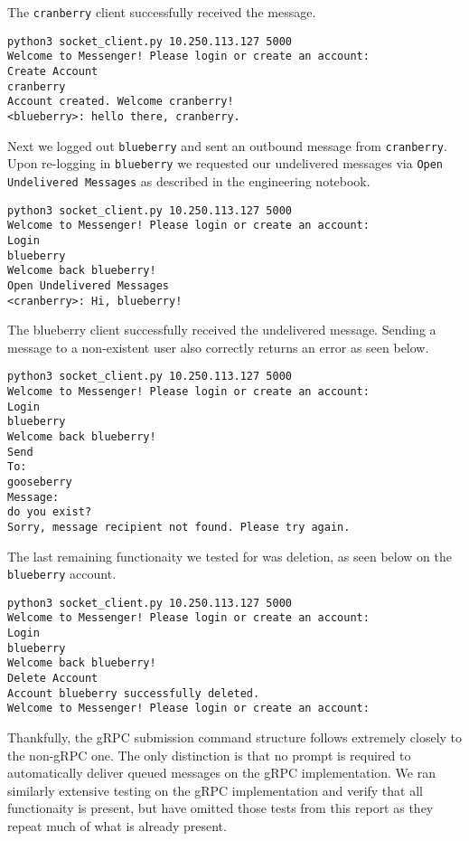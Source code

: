 \documentclass[9pt,twocolumn,twoside]{osajnl}
\begin{document}
\noindent The \texttt{cranberry} client successfully received the message.

\begin{lstlisting}[caption={Receive Live Message Test}]
python3 socket_client.py 10.250.113.127 5000
Welcome to Messenger! Please login or create an account:
Create Account
cranberry
Account created. Welcome cranberry!
<blueberry>: hello there, cranberry.
\end{lstlisting}

\noindent Next we logged out \texttt{blueberry} and sent an outbound message from \texttt{cranberry}. Upon re-logging in \texttt{blueberry} we requested our undelivered messages via \texttt{Open Undelivered Messages} as described in the engineering notebook.

\begin{lstlisting}[caption={Receive Undelivered Message Test}]
python3 socket_client.py 10.250.113.127 5000
Welcome to Messenger! Please login or create an account:
Login 
blueberry
Welcome back blueberry!
Open Undelivered Messages
<cranberry>: Hi, blueberry!
\end{lstlisting}

\noindent The blueberry client successfully received the undelivered message. Sending a message to a non-existent user also correctly returns an error as seen below.

\begin{lstlisting}[caption={Send Message to Nonexistent User Test}]
python3 socket_client.py 10.250.113.127 5000
Welcome to Messenger! Please login or create an account:
Login
blueberry
Welcome back blueberry!
Send
To: 
gooseberry
Message: 
do you exist?
Sorry, message recipient not found. Please try again. 
\end{lstlisting}

\noindent The last remaining functionaity we tested for was deletion, as seen below on the \texttt{blueberry} account.

\begin{lstlisting}[caption={Account Deletion Test}]
python3 socket_client.py 10.250.113.127 5000
Welcome to Messenger! Please login or create an account:
Login
blueberry
Welcome back blueberry!
Delete Account
Account blueberry successfully deleted. 
Welcome to Messenger! Please login or create an account:
\end{lstlisting}

\noindent Thankfully, the gRPC submission command structure follows extremely closely to the non-gRPC one. The only distinction is that no prompt is required to
automatically deliver queued messages on the gRPC implementation. We ran similarly extensive testing on the gRPC implementation and verify that all functionaity is present, but have omitted those tests from this report as they repeat much of what is already present. 
\end{document}
